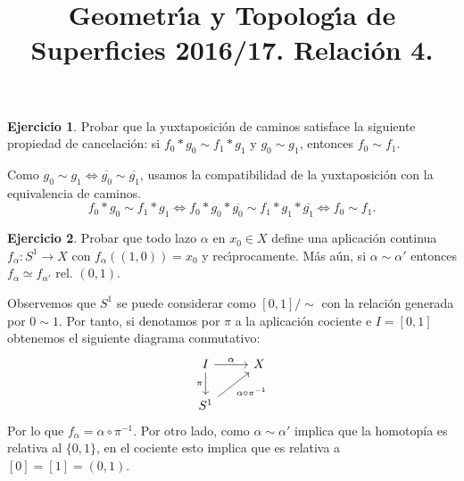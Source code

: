 \documentclass[12pt,a4paper]{amsart}
\title{Geometr\'{\i}a y Topolog\'{\i}a de Superficies 2016/17. Relaci\'on 4.}
\theoremstyle{definition}               %
\newtheorem{nothing}{Ejercicio}
\theoremstyle{plain}
\newenvironment{solucion}{\begin{trivlist}
	\item[\hskip \labelsep {\textit{Solución}.}\hskip \labelsep]}{\end{trivlist}}
\begin{document}
\maketitle



\begin{nothing} Probar que la yuxtaposici\'on de caminos satisface la siguiente propiedad de cancelaci\'on: si $f_0*g_0 \sim f_1* g_1$ y $g_0 \sim g_1$, entonces $f_0 \sim f_1$.
\end{nothing}
\begin{solucion}
Como $g_0 \sim g_1\Leftrightarrow \overline{g_0}\sim\overline{g_1}$, usamos la compatibilidad de la yuxtaposición con la equivalencia de caminos.
\[
f_0*g_0 \sim f_1* g_1\Leftrightarrow f_0*g_0*\overline{g_0}\sim f_1*g_1*\overline{g_1}\Leftrightarrow f_0\sim f_1.
\]
\end{solucion}

\vspace{0.1cm}

\begin{nothing} \label{s1}Probar que todo lazo $\alpha$ en $x_0\in X$ define una aplicaci\'on continua $f_\alpha: S^1 \to X$ con $f_\alpha((1,0)) = x_0$ y rec\'{\i}procamente. M\'as a\'un, si $\alpha \sim \alpha'$ entonces $f_{\alpha} \simeq f_{\alpha'} \mbox{ rel. } (0,1)$.
\end{nothing}
\begin{solucion}
Observemos que $S^1$ se puede considerar como $[0,1]/\sim$ con la relación generada por $0\sim 1$. Por tanto, si denotamos por $\pi$ a la aplicación cociente e $I=[0,1]$ obtenemos el siguiente diagrama conmutativo:
\[
\begin{tikzcd}
I\arrow[r,"\alpha"]\arrow[d,"\pi"'] & X\\
S^1\arrow[ur,"\alpha\circ\pi^{-1}"']
\end{tikzcd}
\]
Por lo que $f_\alpha=\alpha\circ\pi^{-1}$. Por otro lado, como $\alpha\sim\alpha'$ implica que la homotopía es relativa al $\{0,1\}$, en el cociente esto implica que es relativa a $[0]=[1]=(0,1)$. 
\end{solucion}

\vspace{0.1cm}
\end{document}
